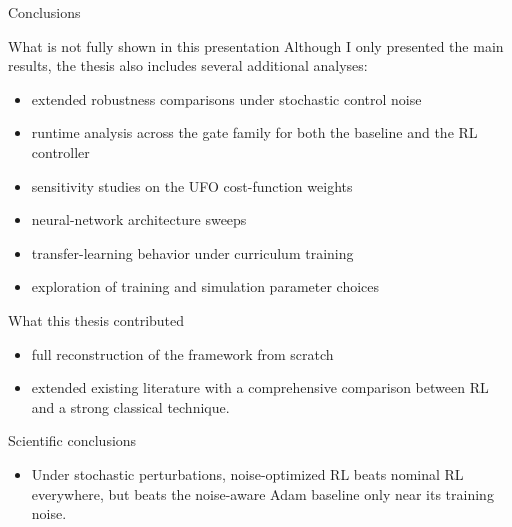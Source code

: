 \documentclass{beamer}
\newcommand{\presenterbox}[1]{%
\begin{tikzpicture}[remember picture,overlay]
    \node[anchor=south east, xshift=-0.0cm, yshift=0.3cm] at (current page.south east) {%
        \tikz{\node[fill=blue!80, rounded corners=3pt, inner sep=3pt]{\color{white}\small\bfseries #1};}%
    };
\end{tikzpicture}%
}
\begin{document}
\begin{frame}{Conclusions}
\scriptsize
\begin{block}{What is not fully shown in this presentation}
Although I only presented the main results, the thesis also includes several additional analyses:
\begin{itemize}
    \item extended robustness comparisons under stochastic control noise
    \item runtime analysis across the gate family for both the baseline and the RL controller
    \item sensitivity studies on the UFO cost-function weights
    \item neural-network architecture sweeps
    \item transfer-learning behavior under curriculum training
    \item exploration of training and simulation parameter choices
\end{itemize}
\end{block}


\begin{alertblock}{What this thesis contributed}
    \begin{itemize}
        \item full reconstruction of the framework from scratch
        \item extended existing literature with a comprehensive comparison between RL and a strong classical technique.
    \end{itemize}
\end{alertblock}
\begin{block}{Scientific conclusions}
\begin{itemize}
    \item Under stochastic perturbations, noise-optimized RL beats nominal RL everywhere, but beats the noise-aware Adam baseline only near its training noise.
\end{itemize}
\end{block}



\end{frame}
\end{document}
